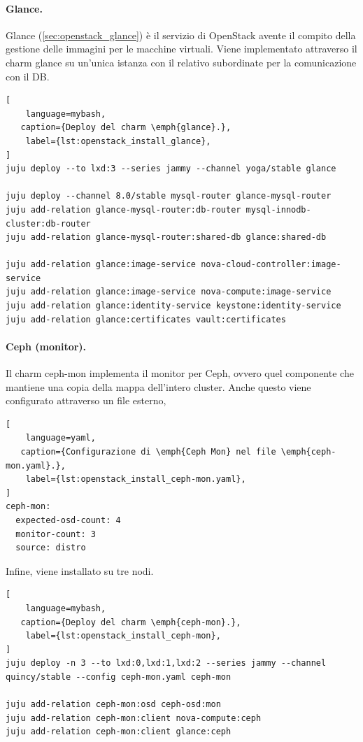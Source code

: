 \paragraph{Glance.}
Glance (\cref{sec:openstack_glance}) è il servizio di OpenStack avente il compito della gestione delle immagini per le macchine virtuali.
% 
Viene implementato attraverso il charm glance su un'unica istanza con il relativo subordinate per la comunicazione con il DB.
\begin{lstlisting}[
    language=mybash, 
   caption={Deploy del charm \emph{glance}.},
    label={lst:openstack_install_glance},
]
juju deploy --to lxd:3 --series jammy --channel yoga/stable glance

juju deploy --channel 8.0/stable mysql-router glance-mysql-router
juju add-relation glance-mysql-router:db-router mysql-innodb-cluster:db-router
juju add-relation glance-mysql-router:shared-db glance:shared-db

juju add-relation glance:image-service nova-cloud-controller:image-service
juju add-relation glance:image-service nova-compute:image-service
juju add-relation glance:identity-service keystone:identity-service
juju add-relation glance:certificates vault:certificates
\end{lstlisting}



\paragraph{Ceph (monitor).}
Il charm ceph-mon implementa il monitor per Ceph, ovvero quel componente che mantiene una copia della mappa dell'intero cluster.
% 
Anche questo viene configurato attraverso un file esterno, 
\begin{lstlisting}[
    language=yaml, 
   caption={Configurazione di \emph{Ceph Mon} nel file \emph{ceph-mon.yaml}.},
    label={lst:openstack_install_ceph-mon.yaml},
]
ceph-mon:
  expected-osd-count: 4
  monitor-count: 3
  source: distro
\end{lstlisting}

\bigskip\noindent
Infine, viene installato su tre nodi.
\begin{lstlisting}[
    language=mybash, 
   caption={Deploy del charm \emph{ceph-mon}.},
    label={lst:openstack_install_ceph-mon},
]
juju deploy -n 3 --to lxd:0,lxd:1,lxd:2 --series jammy --channel quincy/stable --config ceph-mon.yaml ceph-mon

juju add-relation ceph-mon:osd ceph-osd:mon
juju add-relation ceph-mon:client nova-compute:ceph
juju add-relation ceph-mon:client glance:ceph
\end{lstlisting}



